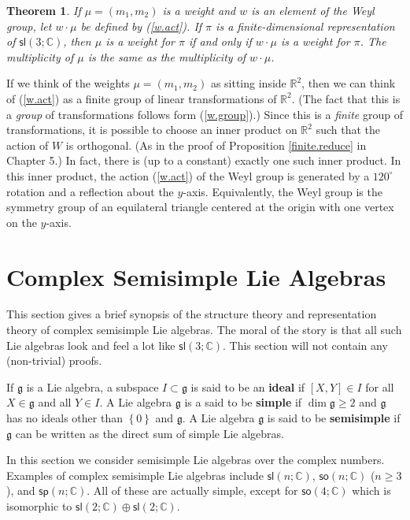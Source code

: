 \documentclass[12pt]{amsbook}
\let \frak = \mathfrak
\theoremstyle{plain}
\newtheorem{theorem}{Theorem}
\numberwithin{equation}{chapter}
\numberwithin{theorem}{chapter}
\begin{document}
\begin{theorem}
If $\mu=(m_{1},m_{2})$ is a weight and $w$ is an element of the Weyl group,
let $w\cdot\mu$ be defined by (\ref{w.act}). If $\pi$ is a finite-dimensional
representation of $\mathsf{sl}\left(  3;\mathbb{C}\right)  $, then $\mu$ is a
weight for $\pi$ if and only if $w\cdot\mu$ is a weight for $\pi$. The
multiplicity of $\mu$ is the same as the multiplicity of $w\cdot\mu$.
\end{theorem}

If we think of the weights $\mu=(m_{1},m_{2})$ as sitting inside
$\mathbb{R}^{2}$, then we can think of (\ref{w.act}) as a finite group of
linear transformations of $\mathbb{R}^{2}$. (The fact that this is a
\textit{group} of transformations follows form (\ref{w.group}).) Since this is
a \textit{finite} group of transformations, it is possible to choose an inner
product on $\mathbb{R}^{2}$ such that the action of $W$ is orthogonal. (As in
the proof of Proposition \ref{finite.reduce} in Chapter 5.) In fact, there is
(up to a constant) exactly one such inner product. In this inner product, the
action (\ref{w.act}) of the Weyl group is generated by a $120^{\circ}$
rotation and a reflection about the $y$-axis. Equivalently, the Weyl group is
the symmetry group of an equilateral triangle centered at the origin with one
vertex on the $y$-axis.

\section{Complex Semisimple Lie Algebras}

This section gives a brief synopsis of the structure theory and representation
theory of complex semisimple Lie algebras. The moral of the story is that all
such Lie algebras look and feel a lot like $\mathsf{sl}\left(  3;\mathbb{C}%
\right)  $. This section will not contain any (non-trivial) proofs.

If $\frak{g}$ is a Lie algebra, a subspace $I\subset\frak{g}$ is said to be an
\textbf{ideal} if $\left[  X,Y\right]  \in I$ for all $X\in\frak{g}$ and all
$Y\in I$. A Lie algebra $\frak{g}$ is a said to be \textbf{simple} if
$\dim\frak{g}\geq2$ and $\frak{g}$ has no ideals other than $\left\{
0\right\}  $ and $\frak{g}$. A Lie algebra $\frak{g}$ is said to be
\textbf{semisimple} if $\frak{g}$ can be written as the direct sum of simple
Lie algebras.

In this section we consider semisimple Lie algebras over the complex numbers.
Examples of complex semisimple Lie algebras include $\mathsf{sl}\left(
n;\mathbb{C}\right)  $, $\mathsf{so}(n;\mathbb{C})$ ($n\geq3$), and
$\mathsf{sp}(n;\mathbb{C})$. All of these are actually simple, except for
$\mathsf{so}(4;\mathbb{C})$ which is isomorphic to $\mathsf{sl}(2;\mathbb{C}%
)\oplus\mathsf{sl}(2;\mathbb{C})$.
\end{document}
